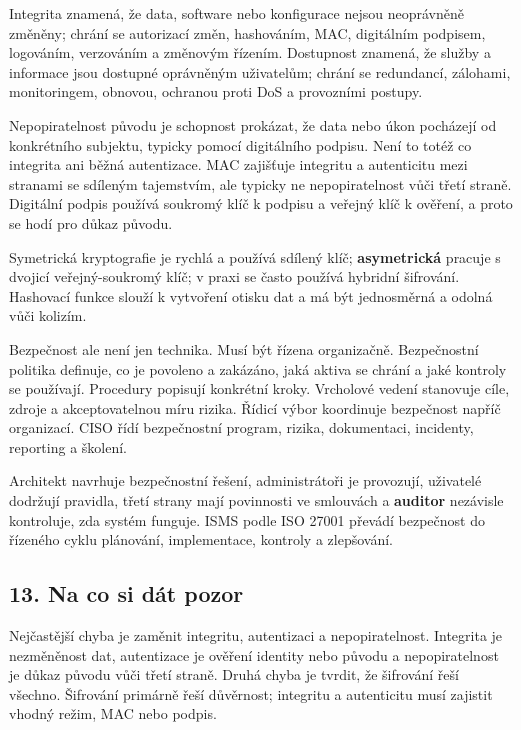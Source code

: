 Integrita znamená, že data, software nebo konfigurace nejsou neoprávněně změněny; chrání se autorizací změn, hashováním, MAC, digitálním podpisem, logováním, verzováním a změnovým řízením. Dostupnost znamená, že služby a informace jsou dostupné oprávněným uživatelům; chrání se redundancí, zálohami, monitoringem, obnovou, ochranou proti DoS a provozními postupy.

Nepopiratelnost původu je schopnost prokázat, že data nebo úkon pocházejí od konkrétního subjektu, typicky pomocí digitálního podpisu. Není to totéž co integrita ani běžná autentizace. MAC zajišťuje integritu a autenticitu mezi stranami se sdíleným tajemstvím, ale typicky ne nepopiratelnost vůči třetí straně. Digitální podpis používá soukromý klíč k podpisu a veřejný klíč k ověření, a proto se hodí pro důkaz původu.

Symetrická kryptografie je rychlá a používá sdílený klíč; \textbf{asymetrická} pracuje s dvojicí veřejný-soukromý klíč; v praxi se často používá hybridní šifrování. Hashovací funkce slouží k vytvoření otisku dat a má být jednosměrná a odolná vůči kolizím.

Bezpečnost ale není jen technika. Musí být řízena organizačně. Bezpečnostní politika definuje, co je povoleno a zakázáno, jaká aktiva se chrání a jaké kontroly se používají. Procedury popisují konkrétní kroky. Vrcholové vedení stanovuje cíle, zdroje a akceptovatelnou míru rizika. Řídicí výbor koordinuje bezpečnost napříč organizací. CISO řídí bezpečnostní program, rizika, dokumentaci, incidenty, reporting a školení.

Architekt navrhuje bezpečnostní řešení, administrátoři je provozují, uživatelé dodržují pravidla, třetí strany mají povinnosti ve smlouvách a \textbf{auditor} nezávisle kontroluje, zda systém funguje. ISMS podle ISO 27001 převádí bezpečnost do řízeného cyklu plánování, implementace, kontroly a zlepšování.

\subsection*{13. Na co si dát pozor}

Nejčastější chyba je zaměnit integritu, autentizaci a nepopiratelnost. Integrita je nezměněnost dat, autentizace je ověření identity nebo původu a nepopiratelnost je důkaz původu vůči třetí straně. Druhá chyba je tvrdit, že šifrování řeší všechno. Šifrování primárně řeší důvěrnost; integritu a autenticitu musí zajistit vhodný režim, MAC nebo podpis.

